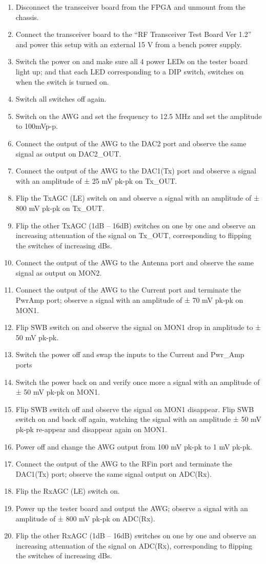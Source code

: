 \begin{enumerate}
	\item Disconnect the transceiver board from the FPGA and unmount from the chassis.
	\item Connect the transceiver board to the “RF Transceiver Test Board Ver 1.2” and power this setup with an external 15 V from a bench power supply.
	\item Switch the power on and make sure all 4 power LEDs on the tester board light up; and that each LED corresponding to a DIP switch, switches on when the switch is turned on.
	\item Switch all switches off again.
	\item Switch on the AWG and set the frequency to 12.5 MHz and set the amplitude to 100mVp-p.
	\item Connect the output of the AWG to the DAC2 port and observe the same signal as output on DAC2\_OUT.
	\item Connect the output of the AWG to the DAC1(Tx) port and observe a signal with an amplitude of ± 25 mV pk-pk on Tx\_OUT.
	\item Flip the TxAGC (LE) switch on and observe a signal with an amplitude of ± 800 mV pk-pk on Tx\_OUT.
	\item Flip the other TxAGC (1dB – 16dB) switches on one by one and observe an increasing attenuation of the signal on Tx\_OUT, corresponding to flipping the switches of increasing dBs.
	\item Connect the output of the AWG to the Antenna port and observe the same signal as output on MON2.
	\item Connect the output of the AWG to the Current port and terminate the PwrAmp port; observe a signal with an amplitude of ± 70 mV pk-pk on MON1.
	\item Flip SWB switch on and observe the signal on MON1 drop in amplitude to ± 50 mV pk-pk.
	\item Switch the power off and swap the inputs to the Current and Pwr\_Amp ports
	\item Switch the power back on and verify once more a signal with an amplitude of ± 50 mV pk-pk on MON1.
	\item Flip SWB switch off and observe the signal on MON1 disappear. Flip SWB switch on and back off again, watching the signal with an amplitude ± 50 mV pk-pk re-appear and disappear again on MON1.
	\item Power off and change the AWG output from 100 mV pk-pk to 1 mV pk-pk.
	\item Connect the output of the AWG to the RFin port and terminate the DAC1(Tx) port; observe the same signal output on ADC(Rx).
	\item Flip the RxAGC (LE) switch on.
	\item Power up the tester board and output the AWG; observe a signal with an amplitude of ± 800 mV pk-pk on ADC(Rx).
	\item Flip the other RxAGC (1dB – 16dB) switches on one by one and observe an increasing attenuation of the signal on ADC(Rx), corresponding to flipping the switches of increasing dBs.
\end{enumerate}

